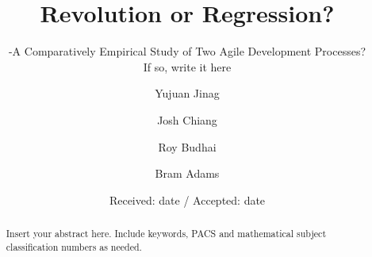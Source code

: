 \title{Revolution or Regression?%
}
\subtitle{-A Comparatively Empirical Study of Two Agile Development Processes?\\ If so, write it here}


\author{Yujuan Jinag         \and
         Josh Chiang \and
	Roy Budhai \and
	Bram Adams %
}



\date{Received: date / Accepted: date}


\maketitle

\begin{abstract}
Insert your abstract here. Include keywords, PACS and mathematical
subject classification numbers as needed.
\end{abstract}


